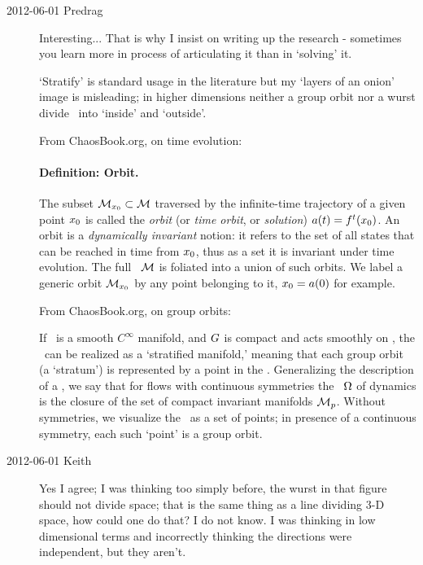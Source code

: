 \begin{description}
\item[2012-06-01 Predrag] Interesting... That is why I insist on writing up
the research - sometimes you learn more in process of articulating it than
in `solving' it.

`Stratify' is standard usage in the literature
but my `layers of an onion' image is misleading; in higher dimensions neither a group
orbit nor a wurst divide \statesp\ into `inside' and `outside'.

From ChaosBook.org, on time evolution:

\paragraph{Definition:
            Orbit.}
The subset ${\cal M}_{x_0} \subset {\cal M}$ traversed by the infinite-time
trajectory of a given point ${x_0}$ is called the \emph{orbit} (or
\emph{time orbit}, or \emph{solution}) $a(t) = {f^{t}({x_0})}$. An
orbit is a {\em dynamically invariant} notion: it refers to the set of
all states that can be reached in time from ${x_0}$, thus as a set it is
invariant under time evolution. The full \statesp\ ${\cal M}$ is foliated
into a union of such orbits. We label a generic orbit
${\cal M}_{x_0}$ by any point belonging to it, ${x_0}=a(0)$ for example.

From ChaosBook.org, on group orbits:

If \pS\ is a
smooth $C^\infty$ manifold, and $G$ is compact and acts
smoothly on \pS, the \reducedsp\ can be realized
as a `stratified manifold,' meaning that each group orbit (a
`stratum') is represented by a point in the \reducedsp.
Generalizing the description
of a \nws,
we say that for flows
with continuous symmetries the \nws\ $\Omega$ of  dynamics
is the closure of the set of compact
invariant manifolds ${\cal M}_p$. Without symmetries, we visualize
the \nws\ as a set of points; in presence of a continuous symmetry,
each such `point' is a group orbit.

\item[2012-06-01 Keith] Yes I agree; I was thinking too simply before,
the wurst in that figure should not divide space; that is the same thing
as a line dividing 3-D space, how could one do that?  I do not know. I
was thinking in low dimensional terms and incorrectly thinking the
directions were independent, but they aren't.


\end{description}
